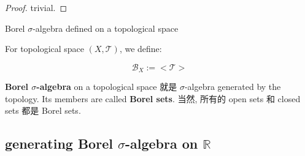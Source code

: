 \documentclass{qlnotes-export}
\begin{document}
\begin{proof}

trivial.

\end{proof}

\begin{definition}{Borel \(\sigma\)-algebra defined on a topological space}\label{def-01-sigma-algebra-measure-borel-sigma-algebra-defined-on-a-topological-space}

For topological space \((X,\mathcal{T})\), we define:

\[\mathcal{B}_{X} := < \mathcal{T} >\]

\end{definition}

\textbf{Borel \(\sigma\)-algebra} on a topological space 就是 \(\sigma\)-algebra generated by the topology. Its members are called \textbf{Borel sets}. 当然, 所有的 open sets 和 closed sets 都是 Borel sets.

\subsection{\texorpdfstring{generating Borel \(\sigma\)-algebra on \(\mathbb{R}\)}{generating Borel \textbackslash sigma-algebra on \textbackslash mathbb\{R\}}}\label{generating-borel-sigma-algebra-on-mathbbr}
\end{document}
